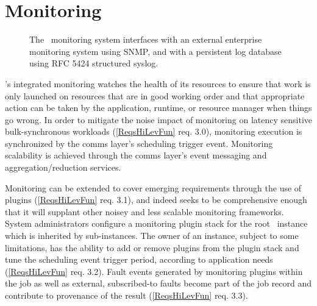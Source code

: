 \section{Monitoring}

\begin{figure}
\centering
{}
\caption{The \ngrm\ monitoring system interfaces with an external
enterprise monitoring system using SNMP, and with a persistent log
database using RFC 5424 structured syslog.}
\label{FigMonExt}
\end{figure}

\ngrm's integrated monitoring watches the health of its resources
to ensure that work is only launched on resources that are in good working
order and that appropriate action can be taken by the application, runtime,
or resource manager when things go wrong.
In order to mitigate the noise impact of monitoring on latency sensitive
bulk-synchronous workloads
(\ref{ReqsHiLevFun} req. 3.0), 
monitoring execution is synchronized by the comms layer's scheduling
trigger event.  Monitoring scalability is achieved through the comms
layer's event messaging and aggregation/reduction services.

Monitoring can be extended to cover emerging requirements
through the use of plugins
(\ref{ReqsHiLevFun} req. 3.1), and indeed seeks to be comprehensive
enough that it will supplant other noisey and less scalable monitoring
frameworks.
System administrators configure a monitoring plugin stack for the
root \ngrm\ instance which is inherited by sub-instances.
The owner of an instance, subject to some limitations, has the ability
to add or remove plugins from the plugin stack and tune the scheduling
event trigger period, according to application needs
(\ref{ReqsHiLevFun} req. 3.2).
Fault events generated by monitoring plugins within the job as well as
external, subscribed-to faults become part of the job record and
contribute to provenance of the result
(\ref{ReqsHiLevFun} req. 3.3).

